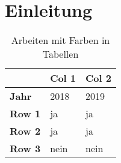
\section{Einleitung}
\label{sec:intro}

\blindmathfalse
\Blindtext[1]

\begin{table}[h!]
    \caption{Arbeiten mit Farben in Tabellen}
    \begin{center}
    \begin{tabular}{lll}
        \toprule
                        &   \textbf{Col 1}          &   \textbf{Col 2}          \\
        \midrule                                                                            
        \textbf{Jahr}   &   2018                    &   2019                    \\
        \midrule
        \textbf{Row 1}  &   \cellcolor{green!20}ja  &   \cellcolor{green!20}ja  \\
        \textbf{Row 2}  &   \cellcolor{green!20}ja  &   \cellcolor{green!20}ja  \\
        \textbf{Row 3}  &   \cellcolor{red!20}nein  &   \cellcolor{red!20}nein  \\
        \bottomrule
    \end{tabular}
    \end{center}
    \label{tab:tabl}
\end{table}


\Blindtext[1]
